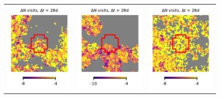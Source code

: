 \documentclass[preprintm,linenumbers]{aastex631}
\begin{document}
\begin{figure}
\begin{tabular}{  c c c}
				\includegraphics{results/skymaps_cutout/skymaps_cutout_delta_first_year_one_snap_v4_0_10yrs_db_noDD_noTwi_tscale-28_nside-256_doAllTemplateMetrics_reduceCount_g_NES_noDD_noTwi.pdf} &
				\includegraphics{results/skymaps_cutout/skymaps_cutout_delta_first_year_one_snap_v4_0_10yrs_db_noDD_noTwi_tscale-28_nside-256_doAllTemplateMetrics_reduceCount_g_WFD_noDD_noTwi.pdf} &
				\includegraphics{results/skymaps_cutout/skymaps_cutout_delta_first_year_one_snap_v4_0_10yrs_db_noDD_noTwi_tscale-28_nside-256_doAllTemplateMetrics_reduceCount_g_GP_noDD_noTwi.pdf} \\

\end{tabular}
\end{figure}
\end{document}
